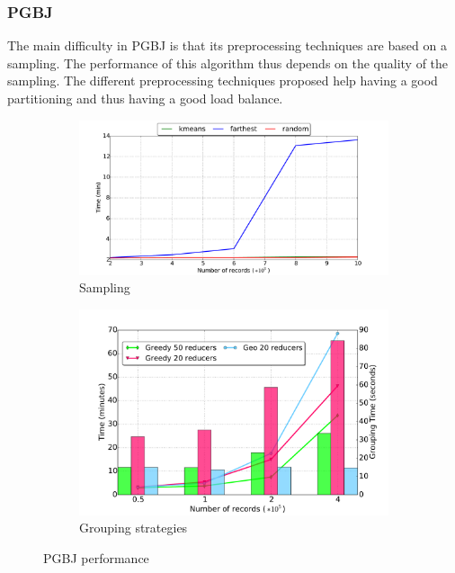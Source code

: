 \subsubsection{PGBJ}
The main difficulty in PGBJ is that its preprocessing techniques are based on a sampling.
The performance of this algorithm thus depends on the quality of the sampling. The different preprocessing techniques proposed help having a good partitioning and thus having a good load balance.
 \begin{figure}[!h]
 \centering
 
 \begin{subfigure}[b]{0.28\textwidth}
                 \includegraphics[width=\textwidth]{img-perf/perso/pgbj/sample.pdf} 
                \caption{Sampling}
                  \label{fig:pgbj_samples}
        \end{subfigure}%
        \begin{subfigure}[b]{0.28\textwidth}
                 \includegraphics[width=\textwidth]{img-perf/perso/pgbj/strategy.pdf} 
                \caption{Grouping strategies}
                  \label{fig:pgbj_strategy}
                   \end{subfigure}
                  
                   \caption{PGBJ performance}
                  \label{fig:pgbj}
        \end{figure}
        
